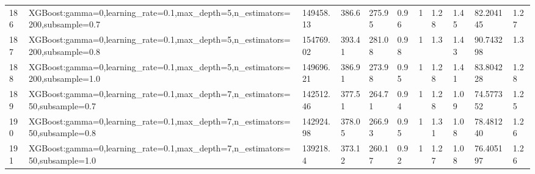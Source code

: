 \begin{longtable}{C{0.8cm} L{2cm} C{1.15cm} C{1.15cm} C{1.15cm} C{1.15cm} C{0.85cm} C{1.25cm} C{1.2cm} C{1.5cm} C{1.0cm}}
186 & XGBoost:\newline gamma=0,\newline learning\_rate=0.1,\newline max\_depth=5,\newline n\_estimators=200,\newline subsample=0.7 & 149458.13 & 386.6 & 275.95 & 0.96 & 1 & 1.28 & 1.45 & 82.204145 & 1.27 \\
187 & XGBoost:\newline gamma=0,\newline learning\_rate=0.1,\newline max\_depth=5,\newline n\_estimators=200,\newline subsample=0.8 & 154769.02 & 393.41 & 281.08 & 0.98 & 1 & 1.3 & 1.43 & 90.743298 & 1.3 \\
188 & XGBoost:\newline gamma=0,\newline learning\_rate=0.1,\newline max\_depth=5,\newline n\_estimators=200,\newline subsample=1.0 & 149696.21 & 386.91 & 273.98 & 0.95 & 1 & 1.28 & 1.41 & 83.804228 & 1.28 \\
189 & XGBoost:\newline gamma=0,\newline learning\_rate=0.1,\newline max\_depth=7,\newline n\_estimators=50,\newline subsample=0.7 & 142512.46 & 377.51 & 264.71 & 0.94 & 1 & 1.28 & 1.09 & 74.577352 & 1.25 \\
190 & XGBoost:\newline gamma=0,\newline learning\_rate=0.1,\newline max\_depth=7,\newline n\_estimators=50,\newline subsample=0.8 & 142924.98 & 378.05 & 266.93 & 0.95 & 1 & 1.31 & 1.08 & 78.481240 & 1.26 \\
191 & XGBoost:\newline gamma=0,\newline learning\_rate=0.1,\newline max\_depth=7,\newline n\_estimators=50,\newline subsample=1.0 & 139218.4 & 373.12 & 260.17 & 0.92 & 1 & 1.27 & 1.08 & 76.405197 & 1.26 \\

\end{longtable}
